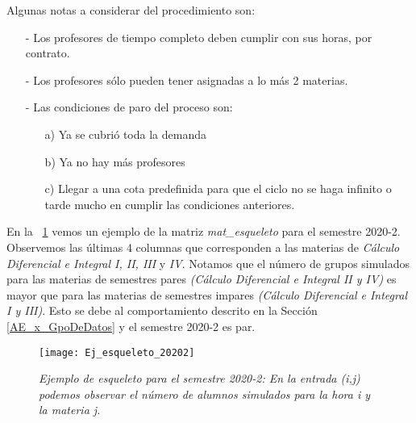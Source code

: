 Algunas notas a considerar del procedimiento son:
  
  \begin{itemize}

\item[-] Los profesores de tiempo completo deben cumplir con sus horas, por contrato.

\item[-] Los profesores sólo pueden tener asignadas a lo más 2 materias.

\item[-] Las condiciones de paro del proceso son:
  
  \begin{itemize}
\item[a)] Ya se cubrió toda la demanda

\item[b)] Ya no hay más profesores

\item[c)] Llegar a una cota predefinida para que el ciclo no se haga infinito o tarde mucho en cumplir las condiciones anteriores.
\end{itemize}
\end{itemize}

En la \figurename{~\ref{esqueleto20202}} vemos un ejemplo de la matriz \textit{mat\_esqueleto} para el semestre 2020-2. Observemos las últimas 4 columnas que corresponden a las materias de \textit{Cálculo Diferencial e Integral I, II, III} y \textit{IV}. Notamos que el número de grupos simulados para las materias de semestres pares \textit{(Cálculo Diferencial e Integral II y IV)} es mayor que para las materias de semestres impares \textit{(Cálculo Diferencial e Integral I y III)}. Esto se debe al comportamiento descrito en la Sección \ref{AE_x_GpoDeDatos} y el semestre 2020-2 es par.

\begin{figure}[H]
\centering
\texttt{[image: Ej\_esqueleto\_20202]} %
\caption[\textit{Ejemplo de esqueleto para el semestre 2020-2}]{\textit{Ejemplo de esqueleto para el semestre 2020-2: En la entrada (i,j) podemos observar el número de alumnos simulados para la hora i y la materia j.}}\label{esqueleto20202}
\end{figure}

%



